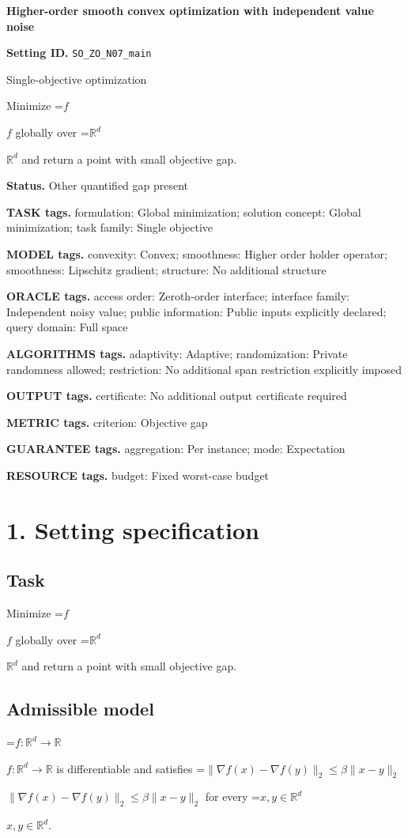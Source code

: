 \documentclass[10pt,a4paper]{article}
\newcommand{\AtlasMath}[1]{\par\begingroup\centering\setbox0=\hbox{$\displaystyle #1$}\ifdim\wd0>1.4\linewidth\typeout{ATLAS WIDE FORMULA: \the\wd0}\fi\ifdim\wd0>\linewidth\resizebox{\linewidth}{!}{\box0}\else\box0\fi\par\endgroup}
\newcommand{\AtlasInlineMath}[1]{\begingroup\setbox0=\hbox{$#1$}\ifdim\wd0>.4\linewidth\endgroup\AtlasMath{#1}\else\endgroup$#1$\fi}
\begin{document}
\raggedright

{\LARGE\bfseries\sffamily\color{AtlasNavy} Higher-order smooth convex optimization with independent value noise\par}\vspace{5pt}
\textbf{Setting ID.} \texttt{SO\_\allowbreak{}ZO\_\allowbreak{}N07\_\allowbreak{}main}

Single-objective optimization

Minimize \AtlasInlineMath{f} globally over \AtlasInlineMath{\mathbb{R}^d} and return a point with small objective gap.

\textbf{Status.} Other quantified gap present

\textbf{TASK tags.} formulation: Global minimization; solution concept: Global minimization; task family: Single objective

\textbf{MODEL tags.} convexity: Convex; smoothness: Higher order holder operator; smoothness: Lipschitz gradient; structure: No additional structure

\textbf{ORACLE tags.} access order: Zeroth-order interface; interface family: Independent noisy value; public information: Public inputs explicitly declared; query domain: Full space

\textbf{ALGORITHMS tags.} adaptivity: Adaptive; randomization: Private randomness allowed; restriction: No additional span restriction explicitly imposed

\textbf{OUTPUT tags.} certificate: No additional output certificate required

\textbf{METRIC tags.} criterion: Objective gap

\textbf{GUARANTEE tags.} aggregation: Per instance; mode: Expectation

\textbf{RESOURCE tags.} budget: Fixed worst-case budget

\section{1. Setting specification}
\subsection{Task}
Minimize \AtlasInlineMath{f} globally over \AtlasInlineMath{\mathbb{R}^d} and return a point with small objective gap.

\subsection{Admissible model}
\AtlasInlineMath{f:\mathbb{R}^d\to\mathbb{R}} is differentiable and satisfies \AtlasInlineMath{\|\nabla f(x)-\nabla f(y)\|_2\le\beta\|x-y\|_2} for every \AtlasInlineMath{x,y\in\mathbb{R}^d}.
\end{document}
